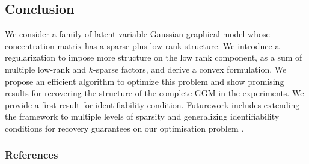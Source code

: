 \documentclass{article}
\begin{document}
\subsection*{Conclusion}
We consider a family of latent variable Gaussian graphical model whose concentration matrix has a sparse plus low-rank structure. We introduce a regularization to impose more structure on the low rank component, as a sum of multiple low-rank and $k$-sparse factors, and derive a convex formulation. We propose an efficient algorithm to optimize this problem and show promising results for recovering the structure of the complete GGM in the experiments. We provide a first result for identifiability condition. Futurework includes extending the framework to multiple levels of sparsity and generalizing identifiability conditions for recovery guarantees on our optimisation problem .
%
%

\subsubsection*{References}


\end{document}
